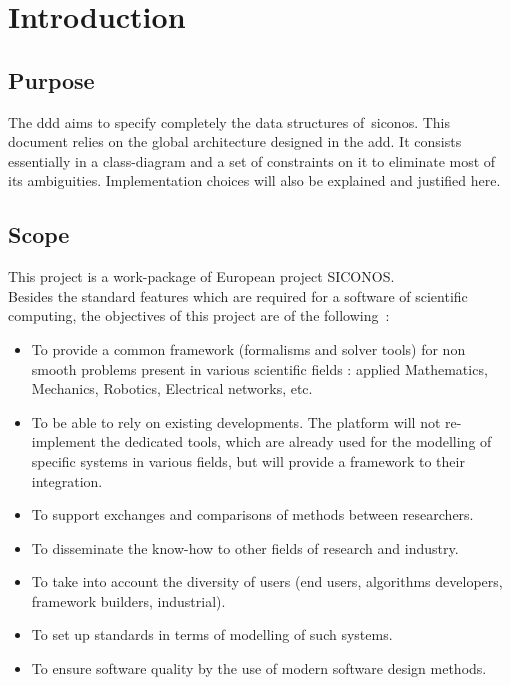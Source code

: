 \section{Introduction}
\label{Sec:DDD-Intoduction}
%

\subsection{Purpose}
\label{Sec:DDD-Purpose}

The \ac{ddd} aims to specify completely the data structures of~\ac{siconos}. This document relies on the global architecture designed in the \ac{add}.
It consists essentially in a class-diagram and a set of constraints on it to eliminate most of its ambiguities. Implementation choices will also be explained and justified here. 


\subsection{Scope}
\label{Sec:DDD-Scope}

This project is a work-package of European project \ac{SICONOS}. \\
Besides the standard features which are required for a software of scientific computing, the objectives of this project are of the following~:
\begin{itemize}
\item To provide a common framework (formalisms and solver tools) for non smooth problems present in various scientific fields : applied Mathematics, Mechanics, Robotics, Electrical networks, etc. 
\item To be able to rely on existing developments. The platform will not re-implement the dedicated tools, which are already used for the modelling of specific systems in various fields, but will provide a framework to their integration.
\item To support exchanges and comparisons of methods between researchers.
\item To disseminate the know-how to other fields of research and industry.
\item To take into account the diversity of users (end users, algorithms developers, framework builders, industrial).
\item To set up standards in terms of modelling of such systems.
\item To ensure software quality by the use of modern software design methods.
\end{itemize}

